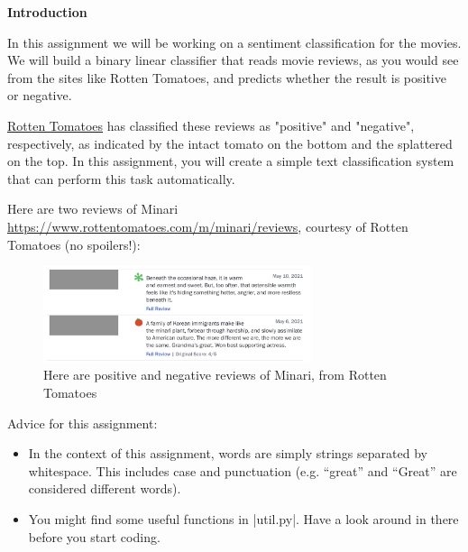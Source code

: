 {\bf Introduction}

In this assignment we will be working on a sentiment classification for the movies. We will build a binary linear classifier that reads movie reviews, as you would see from the sites like Rotten Tomatoes, and predicts whether the result is positive or negative.

\href{https://www.rottentomatoes.com/}{Rotten Tomatoes} has classified these reviews as "positive" and "negative", respectively, as indicated by the intact tomato on the bottom and the splattered on the top. In this assignment, you will create a simple text classification system that can perform this task automatically.

Here are two reviews of Minari \url{https://www.rottentomatoes.com/m/minari/reviews}, courtesy of Rotten Tomatoes (no spoilers!):


\begin{figure}[h]
    \begin{center}
        \captionsetup{width=0.8\textwidth}
        \includegraphics[width=0.7\textwidth]{images/minari.png}
        \caption{Here are positive and negative reviews of Minari, from Rotten Tomatoes}
        \label{rotton_tomatoespos}
    \end{center}
\end{figure}


Advice for this assignment:
\begin{itemize}
  \item In the context of this assignment, words are simply strings separated
  by whitespace. This includes case and punctuation (e.g. ``great'' and
  ``Great'' are considered different words).
  \item You might find some useful functions in |util.py|.  Have a look
  around in there before you start coding.
\end{itemize}
